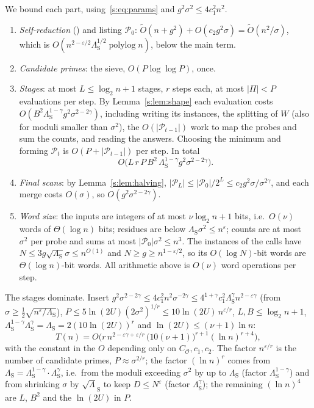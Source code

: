 \documentclass[11pt]{article}
\theoremstyle{definition}
\theoremstyle{remark}
\newcommand{\Pq}{\mathcal{P}}
\begin{document}
We bound each part, using~\eqref{s:eq:params} and $g^2\sigma^2\le4c_1^2n^2$.
\begin{enumerate}[label=(\roman*)]
\item \emph{Self-reduction} (\cite[Lemma~3.3]{FKP24}) and listing $\Pq_0$: $\tilde O(n+g^2)+O(c_2g^2\sigma)=\tilde O(n^2/\sigma)$, which is $O(n^{2-\varepsilon/2}\Lambda_{\mathrm S}^{1/2}\operatorname{polylog}n)$, below the main term.
\item \emph{Candidate primes}: the sieve, $O(P\log\log P)$, once.
\item \emph{Stages}: at most $L\le\log_2n+1$ stages, $r$ steps each, at most $|\Pi|<P$ evaluations per step. By Lemma~\ref{s:lem:shape} each evaluation costs $O(B^2\Lambda_{\mathrm S}^{1-\gamma}g^2\sigma^{2-2\gamma})$, including writing its instances, the splitting of $W$ (also for moduli smaller than $\sigma^2$), the $O(|\Pq_{t-1}|)$ work to map the probes and sum the counts, and reading the answers. Choosing the minimum and forming $\Pq_t$ is $O(P+|\Pq_{t-1}|)$ per step. In total
\[
O\big(L\,r\,P\,B^2\,\Lambda_{\mathrm S}^{1-\gamma}g^2\sigma^{2-2\gamma}\big).
\]
\item \emph{Final scans}: by Lemma~\ref{s:lem:halving}, $|\Pq_L|\le|\Pq_0|/2^L\le c_2g^2\sigma/\sigma^{2\gamma}$, and each merge costs $O(\sigma)$, so $O(g^2\sigma^{2-2\gamma})$.
\item \emph{Word size}: the inputs are integers of at most $\nu\log_2n+1$ bits, i.e.\ $O(\nu)$ words of $\Theta(\log n)$ bits; residues are below $\Lambda_{\mathrm S}\sigma^2\le n^\varepsilon$; counts are at most $\sigma^2$ per probe and sums at most $|\Pq_0|\sigma^2\le n^3$. The instances of the calls have $N\le3g\sqrt{\Lambda_{\mathrm S}}\sigma\le n^{O(1)}$ and $N\ge g\ge n^{1-\varepsilon/2}$, so its $O(\log N)$-bit words are $\Theta(\log n)$-bit words. All arithmetic above is $O(\nu)$ word operations per step.
\end{enumerate}
The stages dominate. Insert $g^2\sigma^{2-2\gamma}\le4c_1^2n^2\sigma^{-2\gamma}\le4^{1+\gamma}c_1^2\Lambda_{\mathrm S}^\gamma n^{2-\varepsilon\gamma}$ (from $\sigma\ge\frac12\sqrt{n^\varepsilon/\Lambda_{\mathrm S}}$), $P\le5\ln(2U)(2\sigma^2)^{1/r}\le10\ln(2U)\,n^{\varepsilon/r}$, $L,B\le\log_2n+1$, $\Lambda_{\mathrm S}^{1-\gamma}\Lambda_{\mathrm S}^\gamma=\Lambda_{\mathrm S}=2(10\ln(2U))^{r}$ and $\ln(2U)\le(\nu+1)\ln n$:
\begin{equation}\label{s:eq:total}
T(n)=O\Big(r\,n^{2-\varepsilon\gamma+\varepsilon/r}\,\big(10(\nu+1)\big)^{r+1}(\ln n)^{r+4}\Big),
\end{equation}
with the constant in the $O$ depending only on $C_{\mathcal O},c_1,c_2$. The factor $n^{\varepsilon/r}$ is the number of candidate primes, $P\approx\sigma^{2/r}$; the factor $(\ln n)^{r}$ comes from $\Lambda_{\mathrm S}=\Lambda_{\mathrm S}^{1-\gamma}\cdot\Lambda_{\mathrm S}^\gamma$, i.e.\ from the moduli exceeding $\sigma^2$ by up to $\Lambda_{\mathrm S}$ (factor $\Lambda_{\mathrm S}^{1-\gamma}$) and from shrinking $\sigma$ by $\sqrt\Lambda_{\mathrm S}$ to keep $D\le N^\varepsilon$ (factor $\Lambda_{\mathrm S}^\gamma$); the remaining $(\ln n)^4$ are $L$, $B^2$ and the $\ln(2U)$ in $P$.
\end{document}
